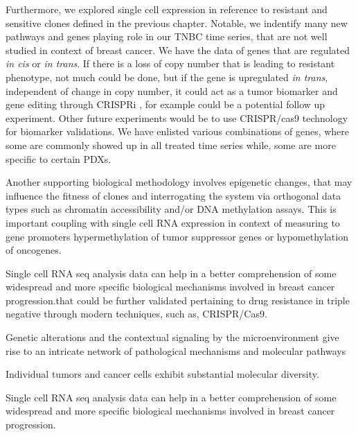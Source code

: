 Furthermore, we explored single cell expression in reference to resistant and sensitive clones defined in the previous chapter. Notable, we indentify many new pathways and genes playing role in our TNBC time series, that are not well studied in context of breast cancer. We have the data of genes that are regulated \textit{in cis} or \textit{in trans}. If there is a loss of copy number that is leading to resistant phenotype, not much could be done, but if the gene is upregulated \textit{in trans}, independent of change in copy number, it could act as a tumor biomarker and gene editing through CRISPRi \cite{larson2013crispr}, for example could be a potential follow up experiment.
Other future experiments would be to use CRISPR/cas9 \cite{doudna2014new} technology for biomarker validations. We have enlisted various combinations of genes, where some are commonly showed up in all treated time series while, some are more specific to certain PDXs. 

Another supporting biological methodology involves epigenetic changes, that may influence the fitness of clones and interrogating the system via orthogonal data types such as chromatin accessibility and/or DNA methylation assays. This is important coupling with single cell RNA expression in context of measuring to gene promoters hypermethylation of tumor suppressor genes  or hypomethylation of oncogenes.








 
 
 
 
 
 
 Single cell RNA seq analysis data can help in a better comprehension of some widespread and more specific biological mechanisms involved in breast cancer progression.that could be further validated pertaining to drug resistance in triple negative through modern techniques, such as, CRISPR/Cas9.

Genetic alterations and the contextual signaling by the microenvironment give rise to an intricate network of pathological mechanisms and molecular pathways


Individual tumors and cancer cells exhibit substantial molecular diversity.

Single cell RNA seq analysis data can help in a better comprehension of some widespread and more specific biological mechanisms involved in breast cancer progression.